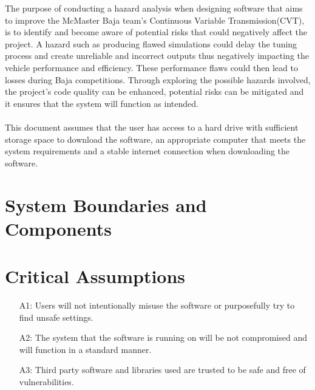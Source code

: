 \documentclass{article}
\begin{document}
The purpose of conducting a hazard analysis when designing software that aims to improve the
McMaster Baja team's Continuous Variable Transmission(CVT), is to identify and become aware of potential risks that could negatively affect the project. 
A hazard such as producing flawed simulations could delay the tuning process and create unreliable and incorrect outputs thus negatively impacting the vehicle performance and efficiency. 
These performance flaws could then lead to losses during Baja competitions. 
Through exploring the possible hazards involved, the project's code quality can be enhanced, potential risks can be mitigated and it ensures that the system will function as intended. 
\\\\
\noindent This document assumes that the user has access to a hard drive with sufficient storage space to download the software, an appropriate computer that meets the system requirements and a stable internet connection when downloading the software. 

\section{System Boundaries and Components}


\section{Critical Assumptions}


\begin{itemize}
    \item [A1:] Users will not intentionally misuse the software or purposefully try to find unsafe settings.
    \item [A2:] The system that the software is running on will be not compromised and will function in a standard manner.
    \item [A3:] Third party software and libraries used are trusted to be safe and free of vulnerabilities.
\end{itemize}
\end{document}
